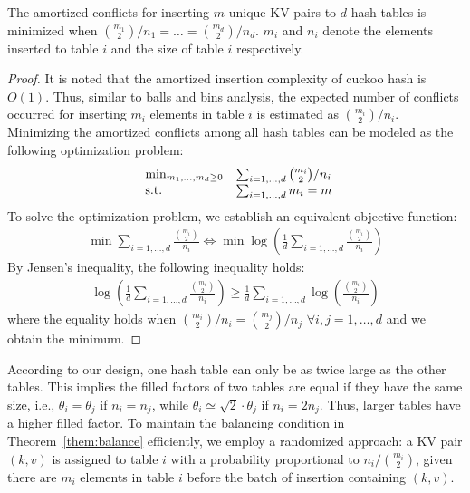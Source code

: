 \begin{theorem}\label{them:balance}
	The amortized conflicts for inserting $m$ unique KV pairs to $d$ hash tables is minimized when $\binom{m_1}{2}/n_1 = \ldots = \binom{m_d}{2}/n_d$. 
	$m_i$ and $n_i$ denote the elements inserted to table $i$ and the size of table $i$ respectively.  
\end{theorem}
\begin{proof}
	It is noted that the amortized insertion complexity of cuckoo hash is $O(1)$. Thus, similar to balls and bins analysis, the expected number of conflicts occurred for inserting $m_i$ elements in table $i$ is estimated as $\binom{m_i}{2}/n_i$. Minimizing the amortized conflicts among all hash tables can be modeled as the following optimization problem:
	\begin{equation}\label{eq:conflict-min}
	\begin{array}{ll@{}ll}
	\min_{m_1,\ldots,m_d \geq 0} & \sum_{i=1,\ldots,d} \binom{m_i}{2}/n_i \\
	\text{s.t.} & \sum_{i=1,\ldots,d} m_i = m
	\end{array}
	\end{equation}
	To solve the optimization problem, we establish an equivalent objective function:
	\begin{align*}
	\min \sum_{i=1,\ldots,d} \frac{\binom{m_i}{2}}{n_i} \Leftrightarrow \min \log(\frac{1}{d}\sum_{i=1,\ldots,d} \frac{\binom{m_i}{2}}{n_i})
	\end{align*}
	By Jensen's inequality, the following inequality holds:
	\begin{align*}
	\log(\frac{1}{d}\sum_{i=1,\ldots,d} \frac{\binom{m_i}{2}}{n_i}) \geq \frac{1}{d}\sum_{i=1,\ldots,d}\log(\frac{\binom{m_i}{2}}{n_i})
	\end{align*}
	where the equality holds when $\binom{m_i}{2}/n_i = \binom{m_j}{2}/n_j$ $\forall i,j = 1,\ldots,d$ and we obtain the minimum.
\end{proof}

According to our design, one hash table can only be as twice large as the other tables. 
This implies the filled factors of two tables are equal if they have the same size, i.e., $\theta_i = \theta_j$ if $n_i = n_j$, 
while $\theta_i \simeq \sqrt{2}\cdot \theta_j$ if $n_i = 2n_j$. 
Thus, larger tables have a higher filled factor. 
To maintain the balancing condition in Theorem~\ref{them:balance} efficiently, we employ a randomized approach: 
a KV pair $(k,v)$ is assigned to table $i$ with a probability proportional to $n_i/\binom{m_i}{2}$,
given there are $m_i$ elements in table $i$ before the batch of insertion containing $(k,v)$. 

